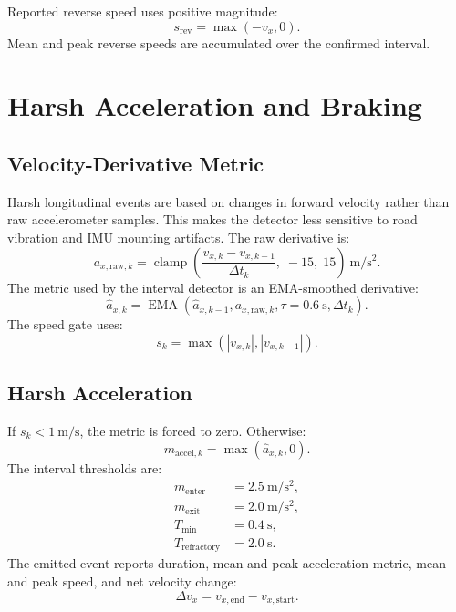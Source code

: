 \documentclass[11pt]{article}
\newcommand{\dt}{\Delta t}
\newcommand{\abs}[1]{\left|#1\right|}
\begin{document}
Reported reverse speed uses positive magnitude:
\begin{equation}
  s_{\mathrm{rev}}=\max(-v_x,0).
\end{equation}
Mean and peak reverse speeds are accumulated over the confirmed interval.

\section{Harsh Acceleration and Braking}

\subsection{Velocity-Derivative Metric}

Harsh longitudinal events are based on changes in forward velocity rather than
raw accelerometer samples. This makes the detector less sensitive to road
vibration and IMU mounting artifacts. The raw derivative is:
\begin{equation}
  a_{x,\mathrm{raw},k} =
  \operatorname{clamp}\left(
    \frac{v_{x,k}-v_{x,k-1}}{\dt_k},\;-15,\;15
  \right)~\mathrm{m/s^2}.
\end{equation}
The metric used by the interval detector is an EMA-smoothed derivative:
\begin{equation}
  \hat{a}_{x,k} = \operatorname{EMA}(\hat{a}_{x,k-1},a_{x,\mathrm{raw},k},\tau=0.6~\mathrm{s},\dt_k).
\end{equation}
The speed gate uses:
\begin{equation}
  s_k=\max(\abs{v_{x,k}},\abs{v_{x,k-1}}).
\end{equation}

\subsection{Harsh Acceleration}

If \(s_k<1~\mathrm{m/s}\), the metric is forced to zero. Otherwise:
\begin{equation}
  m_{\mathrm{accel},k}=\max(\hat{a}_{x,k},0).
\end{equation}
The interval thresholds are:
\begin{align}
  m_{\mathrm{enter}} &= 2.5~\mathrm{m/s^2},\\
  m_{\mathrm{exit}} &= 2.0~\mathrm{m/s^2},\\
  T_{\min} &= 0.4~\mathrm{s},\\
  T_{\mathrm{refractory}} &= 2.0~\mathrm{s}.
\end{align}
The emitted event reports duration, mean and peak acceleration metric, mean and
peak speed, and net velocity change:
\begin{equation}
  \Delta v_x = v_{x,\mathrm{end}}-v_{x,\mathrm{start}}.
\end{equation}
\end{document}
